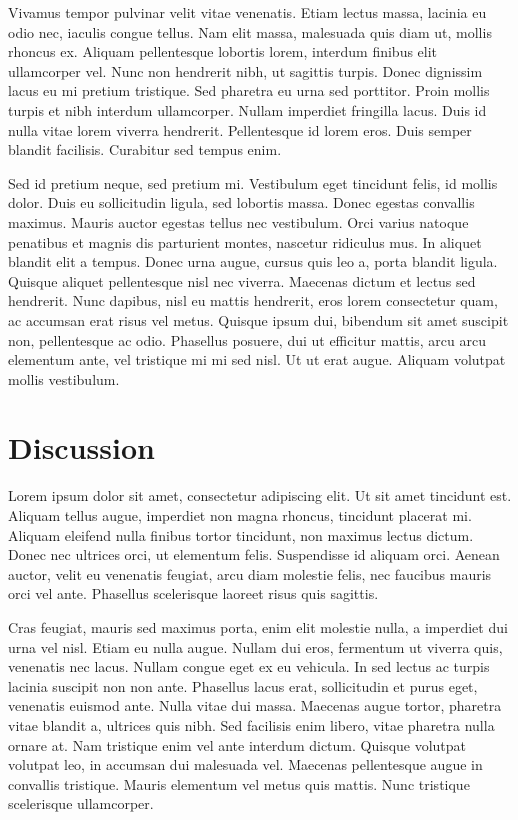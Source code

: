 \documentclass[conference]{IEEEtran}
\begin{document}
Vivamus tempor pulvinar velit vitae venenatis. Etiam lectus massa, lacinia eu odio nec, iaculis congue tellus. Nam elit massa, malesuada quis diam ut, mollis rhoncus ex. Aliquam pellentesque lobortis lorem, interdum finibus elit ullamcorper vel. Nunc non hendrerit nibh, ut sagittis turpis. Donec dignissim lacus eu mi pretium tristique. Sed pharetra eu urna sed porttitor. Proin mollis turpis et nibh interdum ullamcorper. Nullam imperdiet fringilla lacus. Duis id nulla vitae lorem viverra hendrerit. Pellentesque id lorem eros. Duis semper blandit facilisis. Curabitur sed tempus enim.

Sed id pretium neque, sed pretium mi. Vestibulum eget tincidunt felis, id mollis dolor. Duis eu sollicitudin ligula, sed lobortis massa. Donec egestas convallis maximus. Mauris auctor egestas tellus nec vestibulum. Orci varius natoque penatibus et magnis dis parturient montes, nascetur ridiculus mus. In aliquet blandit elit a tempus. Donec urna augue, cursus quis leo a, porta blandit ligula. Quisque aliquet pellentesque nisl nec viverra. Maecenas dictum et lectus sed hendrerit. Nunc dapibus, nisl eu mattis hendrerit, eros lorem consectetur quam, ac accumsan erat risus vel metus. Quisque ipsum dui, bibendum sit amet suscipit non, pellentesque ac odio. Phasellus posuere, dui ut efficitur mattis, arcu arcu elementum ante, vel tristique mi mi sed nisl. Ut ut erat augue. Aliquam volutpat mollis vestibulum. 

\section{Discussion}

Lorem ipsum dolor sit amet, consectetur adipiscing elit. Ut sit amet tincidunt est. Aliquam tellus augue, imperdiet non magna rhoncus, tincidunt placerat mi. Aliquam eleifend nulla finibus tortor tincidunt, non maximus lectus dictum. Donec nec ultrices orci, ut elementum felis. Suspendisse id aliquam orci. Aenean auctor, velit eu venenatis feugiat, arcu diam molestie felis, nec faucibus mauris orci vel ante. Phasellus scelerisque laoreet risus quis sagittis.

Cras feugiat, mauris sed maximus porta, enim elit molestie nulla, a imperdiet dui urna vel nisl. Etiam eu nulla augue. Nullam dui eros, fermentum ut viverra quis, venenatis nec lacus. Nullam congue eget ex eu vehicula. In sed lectus ac turpis lacinia suscipit non non ante. Phasellus lacus erat, sollicitudin et purus eget, venenatis euismod ante. Nulla vitae dui massa. Maecenas augue tortor, pharetra vitae blandit a, ultrices quis nibh. Sed facilisis enim libero, vitae pharetra nulla ornare at. Nam tristique enim vel ante interdum dictum. Quisque volutpat volutpat leo, in accumsan dui malesuada vel. Maecenas pellentesque augue in convallis tristique. Mauris elementum vel metus quis mattis. Nunc tristique scelerisque ullamcorper.
\end{document}
